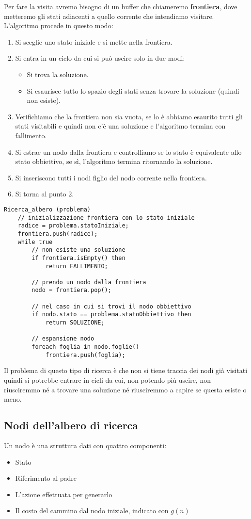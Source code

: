Per fare la visita avremo bisogno di un buffer che chiameremo \textbf{frontiera}, dove metteremo
gli stati adiacenti a quello corrente che intendiamo visitare.
\newpage
L'algoritmo procede in questo modo:
\begin{enumerate}
	\item Si sceglie uno stato iniziale e si mette nella frontiera.
	\item Si entra in un ciclo da cui si pu\`o uscire solo in due modi:
	      \begin{itemize}
		      \item Si trova la soluzione.
		      \item Si esaurisce tutto lo spazio degli stati senza trovare la soluzione (quindi
		            non esiste).
	      \end{itemize}
	\item Verifichiamo che la frontiera non sia vuota, se lo \`e abbiamo esaurito tutti gli
	      stati visitabili e quindi non c'\`e una soluzione e l'algoritmo termina con
	      fallimento.
	\item Si estrae un nodo dalla frontiera e controlliamo se lo stato \`e equivalente allo
	      stato obbiettivo, se s\`i, l'algoritmo termina ritornando la soluzione.
	\item Si inseriscono tutti i nodi figlio del nodo corrente nella frontiera.
	\item Si torna al punto 2.
\end{enumerate}
\begin{lstlisting}[style=pseudo-style]
Ricerca_albero (problema)
	// inizializzazione frontiera con lo stato iniziale
	radice = problema.statoIniziale;
	frontiera.push(radice);
	while true
		// non esiste una soluzione
		if frontiera.isEmpty() then
			return FALLIMENTO;
		
		// prendo un nodo dalla frontiera
		nodo = frontiera.pop();
		
		// nel caso in cui si trovi il nodo obbiettivo
		if nodo.stato == problema.statoObbiettivo then
			return SOLUZIONE;
		
		// espansione nodo
		foreach foglia in nodo.foglie()
			frontiera.push(foglia);
\end{lstlisting}
Il problema di questo tipo di ricerca \`e che non si tiene traccia dei nodi gi\`a visitati
quindi si potrebbe entrare in cicli da cui, non potendo pi\`u uscire, non riusciremmo n\'e
a trovare una soluzione n\'e riusciremmo a capire se questa esiste o meno.

\subsection{Nodi dell'albero di ricerca}
Un nodo \`e una struttura dati con quattro componenti:
\begin{itemize}
	\item Stato
	\item Riferimento al padre
	\item L'azione effettuata per generarlo
	\item Il costo del cammino dal nodo iniziale, indicato con $g(n)$
\end{itemize}

